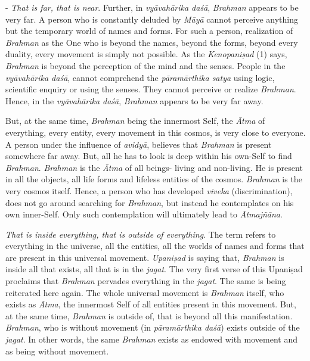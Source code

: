 - \emph{That is far, that is near}. Further, in \emph{vyāvahārika daśā}, \emph{Brahman} appears to be very far. A person who is constantly deluded by \emph{Māyā} cannot perceive anything but the temporary world of names and forms. For such a person, realization of \emph{Brahman} as the One who is beyond the names, beyond the forms, beyond every duality, every movement is simply not possible. As the \emph{Kenopaniṣad} (1) says, \emph{Brahman} is beyond the perception of the mind and the senses. People in the \emph{vyāvahārika daśā}, cannot comprehend the \emph{pāramārthika satya} using logic, scientific enquiry or using the senses. They cannot perceive or realize \emph{Brahman}. Hence, in the \emph{vyāvahārika daśā}, \emph{Brahman} appears to be very far away.

But, at the same time, \emph{Brahman} being the innermost Self, the \emph{Ātma} of everything, every entity, every movement in this cosmos, is very close to everyone. A person under the influence of \emph{avidyā}, believes that \emph{Brahman} is present somewhere far away. But, all he has to look is deep within his own-Self to find \emph{Brahman}. \emph{Brahman} is the \emph{Ātma} of all beings- living and non-living. He is present in all the objects, all life forms and lifeless entities of the cosmos. \emph{Brahman} is the very cosmos itself. Hence, a person who has developed \emph{viveka} (discrimination), does not go around searching for \emph{Brahman}, but instead he contemplates on his own inner-Self. Only such contemplation will ultimately lead to \emph{Ātmajñāna}.

 \emph{That is inside everything, that is outside of everything}. The term  refers to everything in the universe, all the entities, all the worlds of names and forms that are present in this universal movement. \emph{Upaniṣad} is saying that, \emph{Brahman} is inside all that exists, all that is in the \emph{jagat}. The very first verse of this Upaniṣad proclaims that \emph{Brahman} pervades everything in the \emph{jagat}. The same is being reiterated here again. The whole universal movement is \emph{Brahman} itself, who exists as \emph{Ātma}, the innermost Self of all entities present in this movement. But, at the same time, \emph{Brahman} is outside of, that is beyond all this manifestation. \emph{Brahman}, who is without movement (in \emph{pāramārthika daśā}) exists outside of the \emph{jagat}. In other words, the same \emph{Brahman} exists as endowed with movement and as being without movement.

